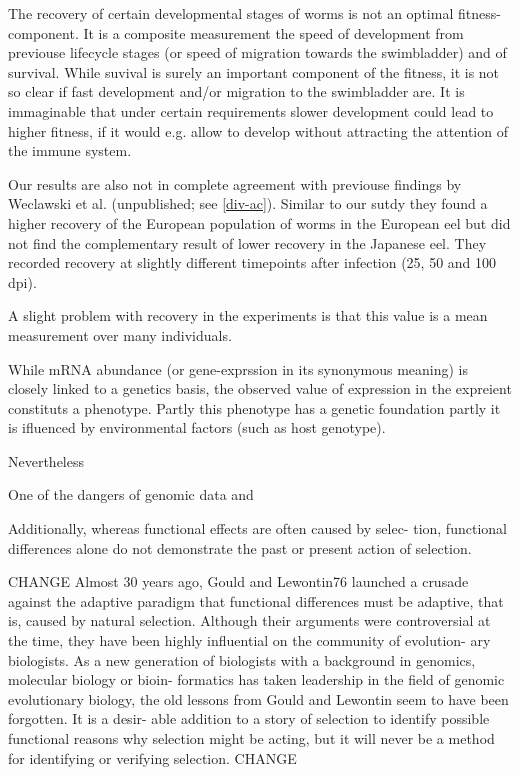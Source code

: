 The recovery of certain developmental stages of worms is not an
optimal fitness-component. It is a composite measurement the speed of
development from previouse lifecycle stages (or speed of migration
towards the swimbladder) and of survival. While suvival is surely an
important component of the fitness, it is not so clear if fast
development and/or migration to the swimbladder are. It is immaginable
that under certain requirements slower development could lead to
higher fitness, if it would e.g. allow to develop without attracting
the attention of the immune system. 

Our results are also not in complete agreement with previouse findings
by Weclawski et al. (unpublished; see \ref{div-ac}). Similar to our
sutdy they found a higher recovery of the European population of worms
in the European eel but did not find the complementary result of lower
recovery in the Japanese eel. They recorded recovery at slightly
different timepoints after infection (25, 50 and 100 dpi).


A slight problem with recovery in the experiments is that this value
is a mean measurement over many individuals.

While mRNA abundance (or gene-exprssion in its synonymous meaning) is
closely linked to a genetics basis, the observed value of expression
in the expreient constituts a phenotype. Partly this phenotype has a
genetic foundation partly it is ifluenced by environmental factors
(such as host genotype).

Nevertheless

One of the dangers of genomic data and 

Additionally, whereas functional effects are often caused by selec-
tion, functional differences alone do not demonstrate the past or
present action of selection.

CHANGE
Almost 30 years ago, Gould and Lewontin76 launched a crusade against
the adaptive paradigm that functional differences must be adaptive,
that is, caused by natural selection. Although their arguments were
controversial at the time, they have been highly influential on the
community of evolution- ary biologists. As a new generation of
biologists with a background in genomics, molecular biology or bioin-
formatics has taken leadership in the field of genomic evolutionary
biology, the old lessons from Gould and Lewontin seem to have been
forgotten. It is a desir- able addition to a story of selection to
identify possible functional reasons why selection might be acting,
but it will never be a method for identifying or verifying selection.
CHANGE

